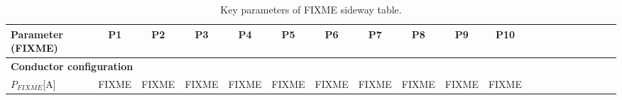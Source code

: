 \begin{table}
	\renewcommand{\arraystretch}{1.2}
	\setlength{\tabcolsep}{5pt}
	\centering
	\footnotesize
	\begin{tabular}{l c c c c c c c c c c c c c c c c c c c}
	\hline
	Parameter (FIXME) & P1 & P2 & P3 & P4 & P5 & P6 & P7 & P8 & P9 & P10\\
	\hline
	\multicolumn{11}{l}{\textbf{Conductor configuration}}\\
	$P_{FIXME}$\hfill[A]& FIXME & FIXME & FIXME & FIXME & FIXME & FIXME & FIXME & FIXME & FIXME & FIXME\\
	\hline
	\end{tabular}
	\caption{Key parameters of FIXME sideway table.}
	\label{tbl2-2}
\end{table}